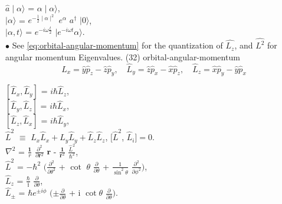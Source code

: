 \documentclass[a4paper, 10pt, onepage]{elegantbook}
\begin{document}
{$\hat{a} \mid \alpha \rangle$ = $\alpha \mid \alpha \rangle$,  \\

$\mid \alpha \rangle$ = $e^{-{\frac{1}{2} \mid \alpha \mid^2}}$ $e^\alpha$ $a^\dagger$ $\mid 0 \rangle$,  \\

$\mid \alpha, t \rangle$ = $e^{-i \omega \frac{t}{2}}$ $\mid e^{-i \omega t} \alpha \rangle$.  \\

$\bullet$ See \eqref{eq:orbital-angular-momentum} for the quantization of $\hat{L_z}$, and $\hat{L^2}$ for angular momentum Eigenvalues. \quad
(32) orbital-angular-momentum \\
\begin{equation}
\hat{L}_x = \hat{y} \hat{p}_z - \hat{z} \hat{p}_y, \quad \hat{L}_y = \hat{z} \hat{p}_x - \hat{x} \hat{p}_z, \quad \hat{L}_z = \hat{x} \hat{p}_y - \hat{y} \hat{p}_x
\end{equation}
\label{eq:orbital-angular-momentum}
\noindent

$[\hat{L}_x, \hat{L}_y]$ = $i \hbar \hat{L}_z$, \\

$[\hat{L}_y, \hat{L}_z]$ = $i \hbar \hat{L}_x$, \\

$[\hat{L}_z, \hat{L}_x]$ = $i \hbar \hat{L}_y$,  \\

$\hat{L}^2$ $\equiv$ $\hat{L}_x \hat{L}_x + \hat{L}_y \hat{L}_y + \hat{L}_z \hat{L}_z$, $[\hat{L}^2$, $\hat{L}_i] = 0$. \\ 

$\nabla^2$ = $\frac{\mathbf 1} {r}$ $\frac{\partial^2}{\partial \mathbf r^2}$ $\mathbf r$ - $\frac{\mathbf 1} {\mathbf r^2}$ $\frac{\hat L^2} {\hbar^2}$,  \\

$\hat{L}^2$ = $- \hbar^2$ $(\frac{\partial^2}{\partial \theta^2}$ + $\cot$ $\theta$ $\frac{\partial}{\partial \theta}$ + $\frac{1}{\sin^2 \theta}$ $\frac{\partial^2}{\partial \phi^2})$,  \\

$\hat{L}_z$ = $\frac{\hbar}{\mathbb i}$ $\frac{\partial}{\partial \theta}$,  \\

$\hat{L}_\pm$ = $\hbar e^{\pm i \phi}$ $(\pm\frac{\partial}{\partial \theta}$ + i $\cot \theta$ $\frac{\partial}{\partial \theta})$.  \\

}
\end{document}
